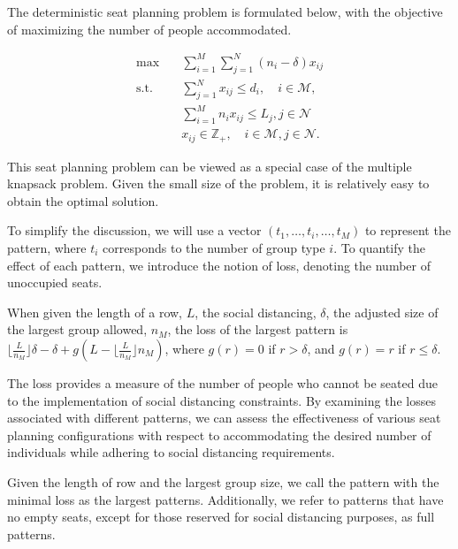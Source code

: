 The deterministic seat planning problem is formulated below, with the objective of maximizing the number of people accommodated.

\begin{equation}\label{deter_upper}
  \begin{aligned}
  \max \quad & \sum_{i=1}^{M}  \sum_{j= 1}^{N} (n_i- \delta) x_{ij} \\
  \text {s.t.} \quad & \sum_{j= 1}^{N} x_{ij} \leq d_{i}, \quad i \in \mathcal{M}, \\
  & \sum_{i=1}^{M} n_{i} x_{ij} \leq L_j, j \in \mathcal{N} \\
  & x_{ij} \in \mathbb{Z}_{+}, \quad i \in \mathcal{M}, j \in \mathcal{N}.
  \end{aligned}
\end{equation}

This seat planning problem can be viewed as a special case of the multiple knapsack problem. Given the small size of the problem, it is relatively easy to obtain the optimal solution.

To simplify the discussion, we will use a vector $(t_1, \ldots, t_i, \ldots, t_M)$ to represent the pattern, where $t_i$ corresponds to the number of group type $i$. To quantify the effect of each pattern, we introduce the notion of loss, denoting the number of unoccupied seats. 

\begin{prop}\label{lem_pattern}
When given the length of a row, $L$, the social distancing, $\delta$, the adjusted size of the largest group allowed, $n_M$, the loss of the largest pattern is $\lfloor \frac{L}{n_M} \rfloor \delta - \delta + g(L - \lfloor \frac{L}{n_M} \rfloor n_M)$, where $g(r)=0$ if $r> \delta$, and $g(r)= r$ if $r \leq \delta$.
\end{prop}

The loss provides a measure of the number of people who cannot be seated due to the implementation of social distancing constraints. By examining the losses associated with different patterns, we can assess the effectiveness of various seat planning configurations with respect to accommodating the desired number of individuals while adhering to social distancing requirements.

\begin{definition}
Given the length of row and the largest group size, we call the pattern with the minimal loss as the largest patterns. Additionally, we refer to patterns that have no empty seats, except for those reserved for social distancing purposes, as full patterns.
\end{definition}

